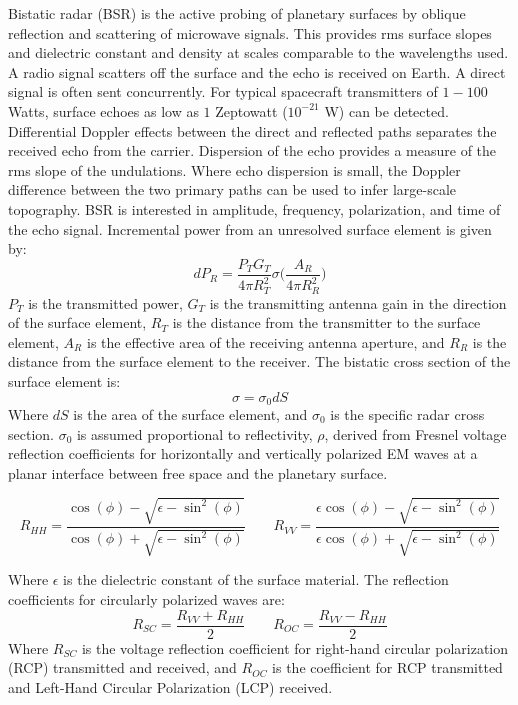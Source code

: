 \documentclass{article}
\begin{document}
            Bistatic radar (BSR) is the active probing of planetary surfaces by oblique reflection and scattering of microwave signals. This provides rms surface slopes and dielectric constant and density at scales comparable to the wavelengths used. A radio signal scatters off the surface and the echo is received on Earth. A direct signal is often sent concurrently. For typical spacecraft transmitters of $1-100$ Watts, surface echoes as low as $1$ Zeptowatt ($10^{-21}$ W) can be detected. Differential Doppler effects between the direct and reflected paths separates the received echo from the carrier. Dispersion of the echo provides a measure of the rms slope of the undulations. Where echo dispersion is small, the Doppler difference between the two primary paths can be used to infer large-scale topography. BSR is interested in amplitude, frequency, polarization, and time of the echo signal. Incremental power from an unresolved surface element is given by:
            \begin{equation}
            dP_{R} = \frac{P_T G_T}{4\pi R_{T}^2}\sigma\bigg(\frac{A_{R}}{4\pi R_{R}^2}\bigg)
            \end{equation}
            $P_T$ is the transmitted power, $G_T$ is the transmitting antenna gain in the direction of the surface element, $R_T$ is the distance from the transmitter to the surface element, $A_R$ is the effective area of the receiving antenna aperture, and $R_R$ is the distance from the surface element to the receiver. The bistatic cross section of the surface element is:
            \begin{equation}
            \sigma = \sigma_{0}dS
            \end{equation}
            Where $dS$ is the area of the surface element, and $\sigma_0$ is the specific radar cross section. $\sigma_0$ is assumed proportional to reflectivity, $\rho$, derived from Fresnel voltage reflection coefficients for horizontally and vertically polarized EM waves at a planar interface between free space and the planetary surface.
            
            \begin{equation}
            R_{HH} = \frac{\cos(\phi) - \sqrt{\epsilon-\sin^2(\phi)}}{\cos(\phi) + \sqrt{\epsilon - \sin^2(\phi)}} \quad \quad
            R_{VV} = \frac{\epsilon \cos(\phi) - \sqrt{\epsilon - \sin^{2}(\phi)}}{\epsilon \cos(\phi) + \sqrt{\epsilon - \sin^2(\phi)}}
            \end{equation}
            
            \noindent Where $\epsilon$ is the dielectric constant of the surface material. The reflection coefficients for circularly polarized waves are:
            \begin{equation}
            R_{SC} = \frac{R_{VV}+R_{HH}}{2} \quad \quad
            R_{OC} = \frac{R_{VV}-R_{HH}}{2}
            \end{equation}
            Where $R_{SC}$ is the voltage reflection coefficient for right-hand circular polarization (RCP) transmitted and received, and $R_{OC}$ is the coefficient for RCP transmitted and Left-Hand Circular Polarization (LCP) received.
            
\end{document}
